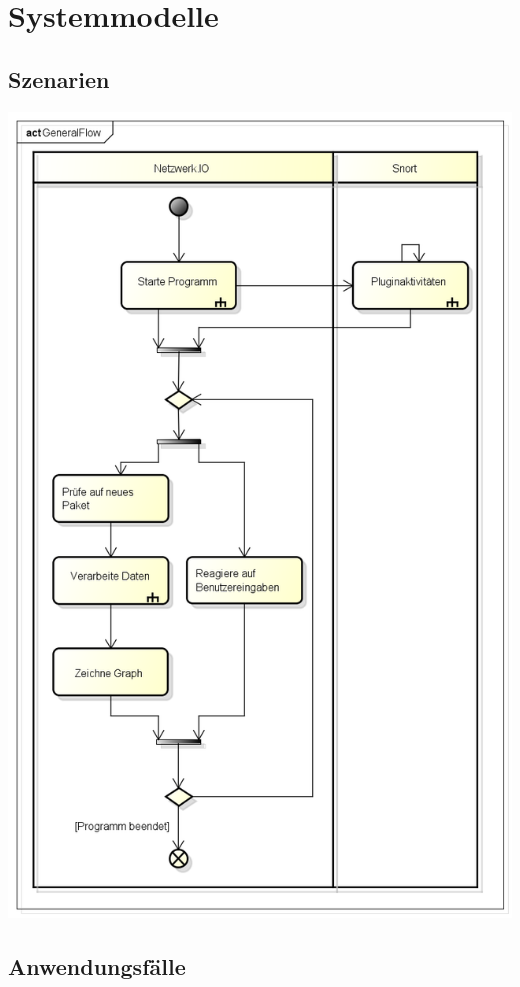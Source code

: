 \chapter{Systemmodelle}

\section{Szenarien}

\includegraphics[width=\textwidth]{GeneralFlow}

\section{Anwendungsfälle} 